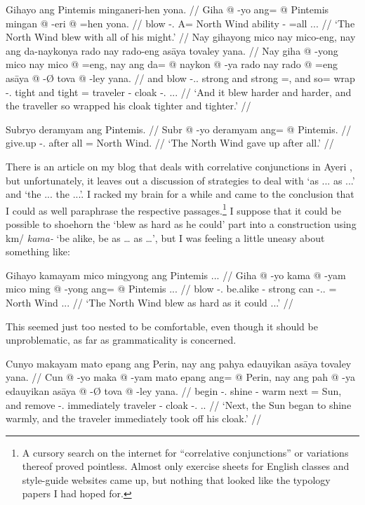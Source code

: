 \documentclass[12pt,paper=a4]{scrartcl}
\newcommand{\xayr}[3]{{\Tagati #1} \emph{#2} \enquote*{#3}}
\begin{document}
\pex %
\a \begingl
	\glpreamble Gihayo ang Pintemis minganeri-hen yona. //
	\gla Giha @ -yo ang= @ Pintemis mingan @ -eri @ =hen yona. //
	\glb blow -\Tsg{}.\N{} A= {North Wind} ability -\Ins{} =all \Tsg{}.\N{}.\Gen{}. //
	\glft `The North Wind blew with all of his might.' //
\endgl
\a \begingl
	\glpreamble Nay gihayong mico nay mico-eng, nay ang da-naykonya rado nay rado-eng asāya tovaley yana. //
	\gla Nay giha @ -yong mico nay mico @ =eng, nay ang da= @ naykon @ -ya rado nay rado @ =eng asāya @ -Ø tova @ -ley yana. //
	\glb and blow -\Tsg.\N{}.\Aarg{} strong and strong =\Comp{}, and \AgtT{} so= wrap -\Tsg{}.\M{} tight and tight =\Comp{} traveler -\Top{} cloak -\Parg{}.\Inan{} \Tsg{}.\M{}.\Gen{}. //
	\glft `And it blew harder and harder, and the traveller so wrapped his cloak tighter and tighter.' //
\endgl

\a \begingl
	\glpreamble Subryo deramyam ang Pintemis. //
	\gla Subr @ -yo deramyam ang= @ Pintemis. //
	\glb give.up -\Tsg{}.\N{} {after all} \Aarg{}= {North Wind}. //
	\glft `The North Wind gave up after all.' //
\endgl
\xe

There is an article on my blog that deals with correlative conjunctions in Ayeri \autocite{becker2012}, but unfortunately, it leaves out a discussion of strategies to deal with `as ... as ...' and `the ... the ...'. I racked my brain for a while and came to the conclusion that I could as well paraphrase the respective passages.\footnote{A cursory search on the internet for \enquote{correlative conjunctions} or variations thereof proved pointless. Almost only exercise sheets for English classes and style-guide websites came up, but nothing that looked like the typology papers I had hoped for.} I suppose that it could be possible to shoehorn the `blew as hard as he could' part into a construction using \xayr{km/}{kama-}{be alike, be as … as …}, but I was feeling a little uneasy about something like:

\ex[exno=iii]
\begingl
	\glpreamble Gihayo kamayam mico mingyong ang Pintemis ... //
	\gla Giha @ -yo kama @ -yam mico ming @ -yong ang= @ Pintemis ... //
	\glb blow -\Tsg{}.\N{} be.alike -\Ptcp{} strong can -\Tsg{}.\N{}.\Aarg{} \Aarg{}= {North Wind} ... //
	\glft `The North Wind blew as hard as it could ...' //
\endgl
\xe

This seemed just too nested to be comfortable, even though it should be unproblematic, as far as grammaticality is concerned.

\ex %
\begingl
	\glpreamble Cunyo makayam mato epang ang Perin, nay ang pahya edauyikan asāya tovaley yana. //
	\gla Cun @ -yo maka @ -yam mato epang ang= @ Perin, nay ang pah @ -ya edauyikan asāya @ -Ø tova @ -ley yana. //
	\glb begin -\Tsg{}.\N{} shine -\Ptcp{} warm next \Aarg{}= Sun, and \AgtT{} remove -\Tsg{}.\M{} immediately traveler -\Top{} cloak -\Parg{}.\Inan{} \Tsg{}.\M.\Gen{} //
	\glft `Next, the Sun began to shine warmly, and the traveler immediately took off his cloak.' //
\endgl
\xe
\end{document}
